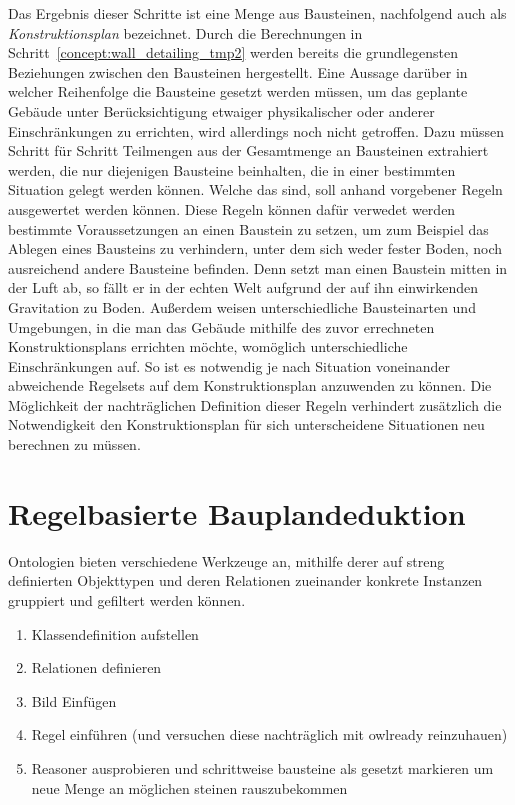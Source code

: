 Das Ergebnis dieser Schritte ist eine Menge aus Bausteinen, nachfolgend auch als \textit{Konstruktionsplan} bezeichnet.
Durch die Berechnungen in Schritt~\ref{concept:wall_detailing_tmp2} werden bereits die grundlegensten Beziehungen zwischen den Bausteinen hergestellt.
Eine Aussage darüber in welcher Reihenfolge die Bausteine gesetzt werden müssen, um das geplante Gebäude unter Berücksichtigung etwaiger physikalischer oder anderer Einschränkungen zu errichten, wird allerdings noch nicht getroffen.
Dazu müssen Schritt für Schritt Teilmengen aus der Gesamtmenge an Bausteinen extrahiert werden, die nur diejenigen Bausteine beinhalten, die in einer bestimmten Situation gelegt werden können.
Welche das sind, soll anhand vorgebener Regeln ausgewertet werden können.
Diese Regeln können dafür verwedet werden bestimmte Voraussetzungen an einen Baustein zu setzen, um zum Beispiel das Ablegen eines Bausteins zu verhindern, unter dem sich weder fester Boden, noch ausreichend andere Bausteine befinden.
Denn setzt man einen Baustein mitten in der Luft ab, so fällt er in der echten Welt aufgrund der auf ihn einwirkenden Gravitation zu Boden.
Außerdem weisen unterschiedliche Bausteinarten und Umgebungen, in die man das Gebäude mithilfe des zuvor errechneten Konstruktionsplans errichten möchte, womöglich unterschiedliche Einschränkungen auf.
So ist es notwendig je nach Situation voneinander abweichende Regelsets auf dem Konstruktionsplan anzuwenden zu können.
Die Möglichkeit der nachträglichen Definition dieser Regeln verhindert zusätzlich die Notwendigkeit den Konstruktionsplan für sich unterscheidene Situationen neu berechnen zu müssen.

\section{Regelbasierte Bauplandeduktion}
Ontologien bieten verschiedene Werkzeuge an, mithilfe derer auf streng definierten Objekttypen und deren Relationen zueinander konkrete Instanzen gruppiert und gefiltert werden können.

\begin{enumerate}
  \item Klassendefinition aufstellen
  \item Relationen definieren
  \item Bild Einfügen
  \item Regel einführen (und versuchen diese nachträglich mit owlready reinzuhauen)
  \item Reasoner ausprobieren und schrittweise bausteine als gesetzt markieren um neue Menge an möglichen steinen rauszubekommen
\end{enumerate}